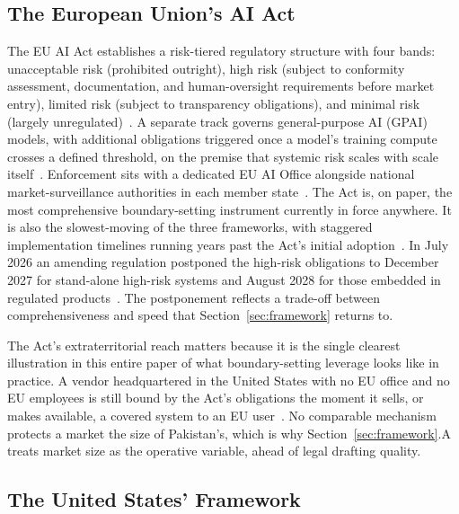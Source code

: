 \documentclass{ieeeaccess}
\begin{document}
\subsection{The European Union's AI Act}

The EU AI Act establishes a risk-tiered regulatory structure with four bands: unacceptable risk (prohibited outright), high risk (subject to conformity assessment, documentation, and human-oversight requirements before market entry), limited risk (subject to transparency obligations), and minimal risk (largely unregulated)~\cite{euaiact2024}.
A separate track governs general-purpose AI (GPAI) models, with additional obligations triggered once a model's training compute crosses a defined threshold, on the premise that systemic risk scales with scale itself~\cite{euaiact2024}.
Enforcement sits with a dedicated EU AI Office alongside national market-surveillance authorities in each member state~\cite{euaiact2024}.
The Act is, on paper, the most comprehensive boundary-setting instrument currently in force anywhere. It is also the slowest-moving of the three frameworks, with staggered implementation timelines running years past the Act's initial adoption~\cite{euaiact2024}. In July 2026 an amending regulation postponed the high-risk obligations to December 2027 for stand-alone high-risk systems and August 2028 for those embedded in regulated products~\cite{euaiomnibus2026}.
The postponement reflects a trade-off between comprehensiveness and speed that Section~\ref{sec:framework} returns to.

The Act's extraterritorial reach matters because it is the single clearest illustration in this entire paper of what boundary-setting leverage looks like in practice. A vendor headquartered in the United States with no EU office and no EU employees is still bound by the Act's obligations the moment it sells, or makes available, a covered system to an EU user~\cite{euaiact2024}.
No comparable mechanism protects a market the size of Pakistan's, which is why Section~\ref{sec:framework}.A treats market size as the operative variable, ahead of legal drafting quality.

\subsection{The United States' Framework}
\end{document}
